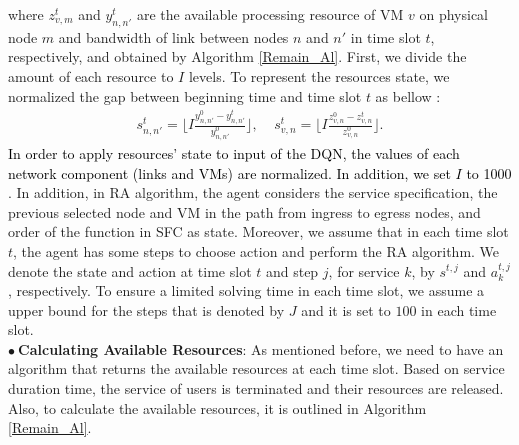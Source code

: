 \documentclass[20pt,twocolumn]{IEEEtran}
\begin{document}
where $z_{v,m}^{t}$ and $y_{n,n'}^{t}$ are the available processing resource of VM $v$ on physical node $m$ and bandwidth of link between nodes ${n}$ and ${n'}$ in time slot $t$, respectively, and obtained by Algorithm \ref{Remain_Al}. First, we divide the amount of each resource to $I$ levels. To represent the resources state, we normalized the gap between  beginning time and  time slot $t$ as bellow \cite{pei2019optimal}:
   	\begin{align}
     {s}^{t}_{{n,n'}}=\lfloor I\frac{y_{{n,n'}}^{0}-y_{{n,n'}}^{t}}{y_{{n,n'}}^{0}}\rfloor,  ~~~~~ s_{v,n}^{t}=\lfloor I \frac{z_{v,n}^{0}-z_{v,n}^{t}}{z_{v,n}^{0}} \rfloor.
   \end{align}
\textcolor{black}{In order to apply resources' state to input of the DQN, the values of each network component (links and VMs) are normalized. %
 In addition, we set $I$ to 1000 \cite{10.1145/3326285.3329056}}. 
In addition, in RA algorithm, the agent considers the service specification, the previous selected node and VM in the path from ingress to egress nodes, and order of the function in SFC as state. Moreover, we assume that in each  time slot $t$, the agent has some steps to choose action and perform the RA algorithm. We denote the state and action at time slot $t$ and step $j$, for service $k$, by $s^{t,j}$ and  $a^{t,j}_{k}$, respectively. To ensure a limited solving time in each time slot, we assume a upper bound for the steps that is denoted by $J$ and it is set to $100$ in each time slot.  \\
$\bullet~$\textbf{Calculating Available Resources}:\label{Remained}
As mentioned before, we need to have an algorithm that returns the available resources at each time slot. Based on service duration time, the service of users is terminated and their resources are released. Also, to calculate the available resources, it is outlined in Algorithm \ref{Remain_Al}.
\end{document}
